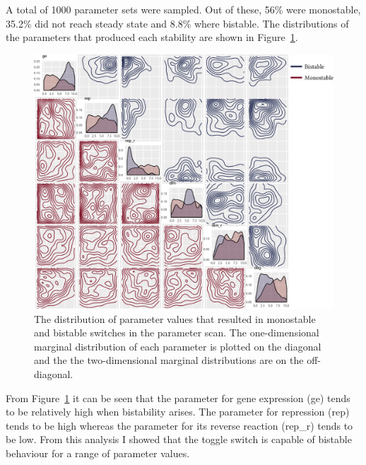A total of 1000 parameter sets were sampled. Out of these, 56\% were monostable, 35.2\% did not reach steady state and 8.8\% where bistable. The distributions of the parameters that produced each stability are shown in Figure~\ref{fig:scan ode param hist}. 

\begin{figure}
\centering
\begin{minipage}[c]{1\textwidth}
\centering
    \includegraphics[width=1.2\textwidth]{../../chapters/chapterABCSysBio/images/param_scan_combo.png}
    \caption[Distributions of the parameters resulting in each stability obtained by the parameter scan]{The distribution of parameter values that resulted in monostable and bistable switches in the parameter scan. The one-dimensional marginal distribution of each parameter is plotted on the diagonal and the the two-dimensional marginal distributions are on the off-diagonal. }
    \label{fig:scan ode param hist}
\end{minipage}
\end{figure}


From Figure~\ref{fig:scan ode param hist} it can be seen that the parameter for gene expression (ge) tends to be relatively high when bistability arises. The parameter for repression (rep) tends to be high whereas the parameter for its reverse reaction (rep\_r) tends to be low. From this analysis I showed that the toggle switch is capable of bistable behaviour for a range of parameter values. 

